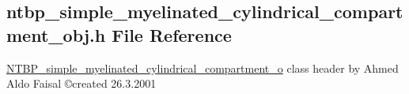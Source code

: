 \subsection{ntbp\_\-simple\_\-myelinated\_\-cylindrical\_\-compartment\_\-obj.h File Reference}
\label{ntbp__simple__myelinated__cylindrical__compartment__obj_8h}



\begin{DoxyItemize}
\item \hyperlink{class_n_t_b_p__simple__myelinated__cylindrical__compartment__o}{NTBP\_\-simple\_\-myelinated\_\-cylindrical\_\-compartment\_\-o} class header by Ahmed Aldo Faisal \copyright created 26.3.2001 
\end{DoxyItemize} 



